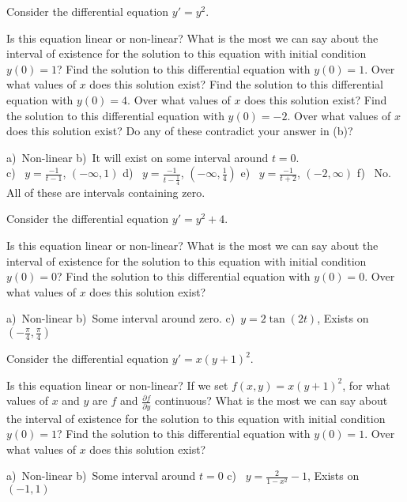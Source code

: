 \begin{exercise}
Consider the differential equation $y' = y^2$. 
\begin{tasks}
\task Is this equation linear or non-linear?
\task What is the most we can say about the interval of existence for the solution to this equation with initial condition $y(0) = 1$?
\task Find the solution to this differential equation with $y(0) = 1$. Over what values of $x$ does this solution exist?
\task Find the solution to this differential equation with $y(0) = 4$. Over what values of $x$ does this solution exist?
\task Find the solution to this differential equation with $y(0) = -2$. Over what values of $x$ does this solution exist?
\task Do any of these contradict your answer in (b)? 
\end{tasks}
\end{exercise}
\comboSol{%
}
{%
a)~Non-linear \quad b)~It will exist on some interval around $t=0$. \\ c)~ $y = \frac{-1}{t-1}$, $(-\infty, 1)$ \quad d)~ $y = \frac{-1}{t - \frac{1}{4}}$, $\left(-\infty, \frac{1}{4}\right)$ \quad e)~ $y = \frac{-1}{t+2}$, $(-2, \infty)$ \quad
f)~ No. All of these are intervals containing zero.
}

\begin{exercise}
Consider the differential equation $y' = y^2 + 4$. 
\begin{tasks}
\task Is this equation linear or non-linear?
\task What is the most we can say about the interval of existence for the solution to this equation with initial condition $y(0) = 0$?
\task Find the solution to this differential equation with $y(0) = 0$. Over what values of $x$ does this solution exist?
\end{tasks}
\end{exercise}
\comboSol{%
}
{%
a)~Non-linear \quad b)~Some interval around zero. \quad c)~$y = 2\tan(2t)$, Exists on $\left(-\frac{\pi}{4}, \frac{\pi}{4}\right)$
}

\begin{exercise}
Consider the differential equation $y' = x(y+1)^2$. 
\begin{tasks}
\task Is this equation linear or non-linear?
\task If we set $f(x,y) = x(y+1)^2$, for what values of $x$ and $y$ are $f$ and $\frac{\partial f}{\partial y}$ continuous?
\task What is the most we can say about the interval of existence for the solution to this equation with initial condition $y(0) = 1$?
\task Find the solution to this differential equation with $y(0) = 1$. Over what values of $x$ does this solution exist?
\end{tasks}
\end{exercise}
\comboSol{%
}
{%
a)~Non-linear \qquad b)~Some interval around $t=0$ \quad c)~ $y = \frac{2}{1-x^2} - 1$, Exists on $(-1, 1)$
}


